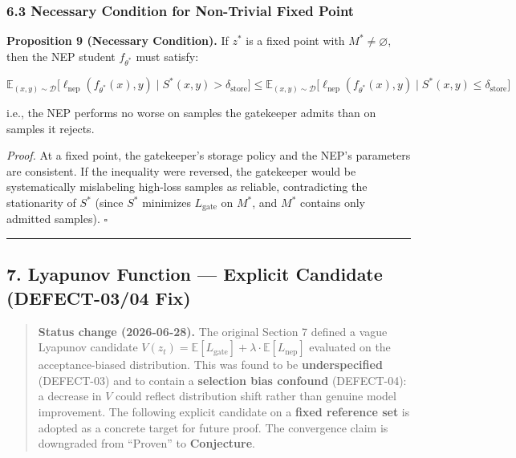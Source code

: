 \documentclass[
  12pt,
]{ctexart}
\begin{document}
\subsubsection{6.3 Necessary Condition for Non-Trivial Fixed
Point}\label{necessary-condition-for-non-trivial-fixed-point}

\textbf{Proposition 9 (Necessary Condition).} If \(z^*\) is a fixed
point with \(M^* \neq \varnothing\), then the NEP student
\(f_{\theta^*}\) must satisfy:

\[\mathbb{E}_{(x,y) \sim \mathcal{D}}\bigl[ \ell_{\text{nep}}(f_{\theta^*}(x), y) \mid S^*(x,y) > \delta_{\text{store}} \bigr] \leq \mathbb{E}_{(x,y) \sim \mathcal{D}}\bigl[ \ell_{\text{nep}}(f_{\theta^*}(x), y) \mid S^*(x,y) \leq \delta_{\text{store}} \bigr]\]

i.e., the NEP performs no worse on samples the gatekeeper admits than on
samples it rejects.

\emph{Proof.} At a fixed point, the gatekeeper's storage policy and the
NEP's parameters are consistent. If the inequality were reversed, the
gatekeeper would be systematically mislabeling high-loss samples as
reliable, contradicting the stationarity of \(S^*\) (since \(S^*\)
minimizes \(L_{\text{gate}}\) on \(M^*\), and \(M^*\) contains only
admitted samples). \(\square\)

\begin{center}\rule{0.5\linewidth}{0.5pt}\end{center}

\subsection{7. Lyapunov Function --- Explicit Candidate (DEFECT-03/04
Fix)}\label{lyapunov-function-explicit-candidate-defect-0304-fix}

\begin{quote}
\textbf{Status change (2026-06-28).} The original Section 7 defined a
vague Lyapunov candidate
\(V(z_t) = \mathbb{E}[L_{\text{gate}}] + \lambda \cdot \mathbb{E}[L_{\text{nep}}]\)
evaluated on the acceptance-biased distribution. This was found to be
\textbf{underspecified} (DEFECT-03) and to contain a \textbf{selection
bias confound} (DEFECT-04): a decrease in \(V\) could reflect
distribution shift rather than genuine model improvement. The following
explicit candidate on a \textbf{fixed reference set} is adopted as a
concrete target for future proof. The convergence claim is downgraded
from ``Proven'' to \textbf{Conjecture}.
\end{quote}
\end{document}
